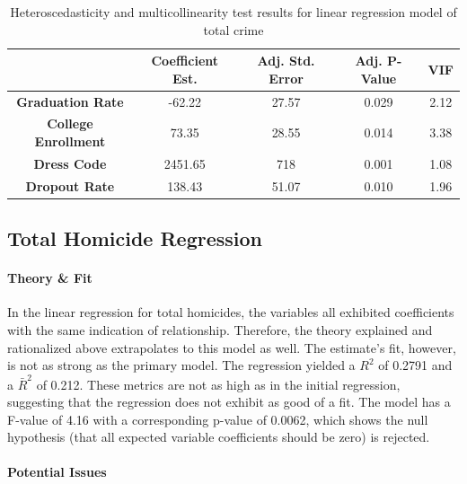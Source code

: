 \documentclass[12pt]{article}
\begin{document}
	\begin{center}
		\begin{table}[h]
			\begin{tabular}{ c | c | c | c | c }
				
				& \textbf{Coefficient Est.} & \textbf{Adj. Std. Error} & \textbf{Adj. P-Value} & \textbf{VIF} \\
				\hline
				\textbf{Graduation Rate} & -62.22 & 27.57 & 0.029 & 2.12  \\
				\textbf{College Enrollment} & 73.35 & 28.55 & 0.014 & 3.38 \\
				\textbf{Dress Code} & 2451.65 & 718 & 0.001 & 1.08 \\
				\textbf{Dropout Rate} & 138.43 & 51.07 & 0.010 & 1.96
				
			\end{tabular}
			\caption{Heteroscedasticity and multicollinearity test results for linear regression model of total crime}
		\end{table}
	\end{center}
	

	\subsection{Total Homicide Regression}

	\paragraph{Theory \& Fit}  In the linear regression for total homicides, the variables all exhibited coefficients with the same indication of relationship.  Therefore, the theory explained and rationalized above extrapolates to this model as well.  The estimate's fit, however, is not as strong as the primary model.  The regression yielded a $ R^{2} $ of 0.2791 and a $ \bar{R}^{2} $ of 0.212.  These metrics are not as high as in the initial regression, suggesting that the regression does not exhibit as good of a fit.  The model has a F-value of 4.16 with a corresponding p-value of 0.0062, which shows the null hypothesis (that all expected variable coefficients should be zero) is rejected.
	
	\paragraph{Potential Issues}
	
\end{document}
